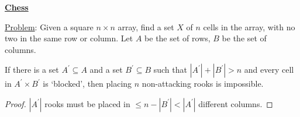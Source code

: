\textbf{\underline{Chess}}

\underline{Problem}: Given a square $ n\times n $ array, find a set $ X $
of $ n $ cells in the array, with no two in the same row or column.
Let $ A $ be the set of rows, $ B $ be the set of columns.

\begin{thmbox}
    \begin{prop}
        If there is a set $ A^\prime \subseteq A $ and a set $ B^\prime \subseteq B $
        such that $ |A^\prime|+|B^\prime|>n $ and every cell in $ A^\prime \times B^\prime $
        is `blocked', then placing $ n $ non-attacking rooks is impossible.
    \end{prop}
\end{thmbox}
\begin{proof}
    $ |A^\prime| $ rooks must be placed in $ \leqslant n-|B^\prime|<|A^\prime| $
    different columns.
\end{proof}

